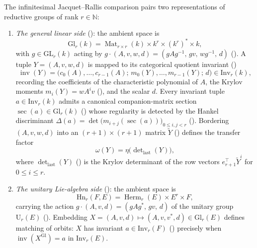 The infinitesimal Jacquet--Rallis comparison pairs two representations of
reductive groups of rank $r \in \mathbb{N}$:
\begin{enumerate}
  \item \emph{The general linear side} (): the
        ambient space is
        \[
          \mathrm{Gl}_r(k) = \operatorname{Mat}_{r \times r}(k) \times k^r \times (k^r)^{*} \times k,
        \]
        with $g \in \mathrm{GL}_r(k)$ acting by
        $g \cdot (A, v, w, d) = (g A g^{-1},\, g v,\, w g^{-1},\, d)$
        ().
        A tuple $Y = (A, v, w, d)$ is mapped to its categorical quotient
        invariant ()
        \[
          \operatorname{inv}(Y)
          = \bigl(c_0(A), \dots, c_{r-1}(A);\, m_0(Y), \dots, m_{r-1}(Y);\, d\bigr)
          \in \mathrm{Inv}_r(k),
        \]
        recording the coefficients of the characteristic polynomial of $A$,
        the Krylov moments $m_i(Y) = w A^i v$ (),
        and the scalar $d$.
        Every invariant tuple $a \in \mathrm{Inv}_r(k)$ admits a canonical
        companion-matrix section $\operatorname{sec}(a) \in \mathrm{Gl}_r(k)$
        () whose regularity is detected by the
        Hankel discriminant $\Delta(a) = \det\bigl(m_{i+j}(\operatorname{sec}(a))\bigr)_{0 \le i, j < r}$
        ().
        Bordering $(A, v, w, d)$ into an $(r+1) \times (r+1)$ matrix
        $\widetilde{Y}$ () defines the transfer
        factor
        \[
          \omega(Y) = \eta\!\bigl(\det\nolimits_{\mathrm{last}}(Y)\bigr),
        \]
        where $\det_{\mathrm{last}}(Y)$ () is
        the Krylov determinant of the row vectors $e_{r+1}^{\top} \widetilde{Y}^i$
        for $0 \le i \le r$.
  \item \emph{The unitary Lie-algebra side} ():
        the ambient space is
        \[
          \mathrm{Hn}_r(F, E) = \operatorname{Herm}_r(E) \times E^r \times F,
        \]
        carrying the action
        $g \cdot (A, v, d) = (g A g^{*},\, g v,\, d)$
        of the unitary group $\mathrm{U}_r(E)$ ().
        Embedding $X = (A, v, d) \mapsto (A, v, v^{*}, d) \in \mathrm{Gl}_r(E)$
        defines matching of orbits: $X$ has invariant $a \in \mathrm{Inv}_r(F)$
        () precisely when
        $\operatorname{inv}(X^{\mathrm{Gl}}) = a$ in $\mathrm{Inv}_r(E)$.
\end{enumerate}


